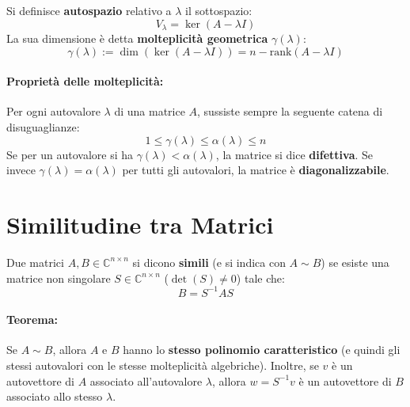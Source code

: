 \documentclass[a4paper,12pt]{article}
\begin{document}
	\begin{tcolorbox}[title=Definizione: Molteplicità Geometrica, colback=white]
		Si definisce \textbf{autospazio} relativo a $\lambda$ il sottospazio:
		\[ V_\lambda = \ker(A - \lambda I) \]
		La sua dimensione è detta \textbf{molteplicità geometrica} $\gamma(\lambda)$:
		\begin{equation}
			\gamma(\lambda) := \dim(\ker(A - \lambda I)) = n - \text{rank}(A - \lambda I)
		\end{equation}
	\end{tcolorbox}
	
	\paragraph{Proprietà delle molteplicità:}
	Per ogni autovalore $\lambda$ di una matrice $A$, sussiste sempre la seguente catena di disuguaglianze:
	\begin{equation}
		1 \le \gamma(\lambda) \le \alpha(\lambda) \le n
	\end{equation}
	Se per un autovalore si ha $\gamma(\lambda) < \alpha(\lambda)$, la matrice si dice \textbf{difettiva}. Se invece $\gamma(\lambda) = \alpha(\lambda)$ per tutti gli autovalori, la matrice è \textbf{diagonalizzabile}.
	\section{Similitudine tra Matrici}
	
	\begin{tcolorbox}[title=Definizione: Matrici Simili]
		Due matrici $A, B \in \mathbb{C}^{n \times n}$ si dicono \textbf{simili} (e si indica con $A \sim B$) se esiste una matrice non singolare $S \in \mathbb{C}^{n \times n}$ ($\det(S) \neq 0$) tale che:
		\begin{equation}
			B = S^{-1} A S
		\end{equation}
	\end{tcolorbox}
	
	\paragraph{Teorema:} 
	Se $A \sim B$, allora $A$ e $B$ hanno lo \textbf{stesso polinomio caratteristico} (e quindi gli stessi autovalori con le stesse molteplicità algebriche). 
	Inoltre, se $v$ è un autovettore di $A$ associato all'autovalore $\lambda$, allora $w = S^{-1}v$ è un autovettore di $B$ associato allo stesso $\lambda$.
	
\end{document}
